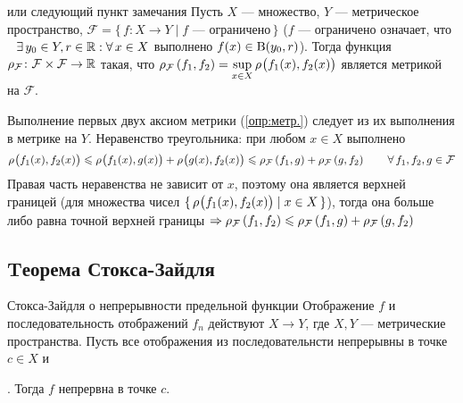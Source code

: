 \begin{lem}[https://www.youtube.com/live/oGN0SkfpZME?si=v9AomZJHSzhlMvMm&t=10556]{или следующий пункт замечания}\label{метр.для отобр.}
	Пусть $X$ --- множество, $Y$ --- метрическое пространство,\quad 
	$\mathcal F = \{\, f \colon X \to Y \mid f\text{ --- ограничено}\,\}$ \linebreak 
	({\small$f$ --- ограничено означает, что$\E y_0 \in Y, r \in \rr : \A x \in X$ выполнено $f(x) \in \B{y_0, r}$}). 
	Тогда функция $\rho_{\mathcal F} \colon \mathcal{F} \times \mathcal{F} \to \rr$ такая, что 
	$\metr[\mathcal F]{f_1, f_2} = \sup\limits_{x \in X} \bmetr{f_1(x), f_2(x)}$ 
	является метрикой на $\mathcal F$.
\end{lem} %
	
\begin{prf} %
	Выполнение \smallskip первых двух аксиом метрики (\ref{опр:метр.}) следует из их выполнения в метрике на $Y$. Неравенство треугольника: при любом $x \in X$ выполнено
	\[\bmetr{f_1(x), f_2(x)} \< \bmetr{f_1(x), g(x)} + \bmetr{g(x), f_2(x)} \< \metr[\mathcal F]{f_1, g} + \metr[\mathcal F]{g, f_2} \qquad \A f_1, f_2, g \in \mathcal F\]
	Правая часть неравенства не зависит от $x$, поэтому она является верхней границей (для множества чисел $\{\,\bmetr{f_1(x), f_2(x)} \mid x \in X\,\}$), тогда она больше \smallskip либо равна точной верхней границы  $\Rightarrow \metr[\mathcal F]{f_1, f_2} \< \metr[\mathcal F]{f_1, g} + \metr[\mathcal F]{g, f_2}$
\end{prf} %

\subsection{Tеорема Стокса-Зайдля}

\begin{teor}[https://www.youtube.com/live/oGN0SkfpZME?si=rzyEi2Hd6nOeRw-i&t=11638]{Стокса-Зайдля о непрерывности предельной функции}\label{ст-зд}
	Отображение $f$ и последовательность отображений $f_n$ действуют $X \to Y$, где $X, Y$ --- метрические пространства. Пусть все отображения из последовательнсти непрерывны в точке $c \in X$ и\!. Тогда $f$ непрервна в точке $c$.
\end{teor} %

